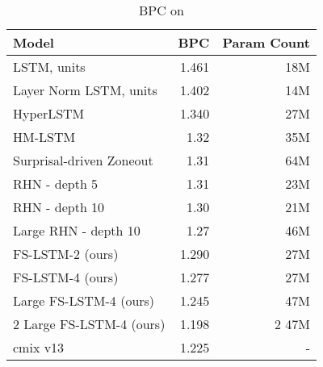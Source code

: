 \documentclass{article}
\begin{document}
\begin{table}
\caption{BPC on }
\label{table: enwik8}
\renewcommand{\arraystretch}{1.1}
\begin{center}
 \begin{tabular}{@{} lrr @{}} 
 \toprule[1.5pt]
 Model & BPC & Param Count \\ 
 \midrule
 LSTM,  units & 1.461 & 18M \\
 Layer Norm LSTM,  units & 1.402 & 14M\\
 HyperLSTM \cite{ha2016hyper} & 1.340 & 27M \\  
 HM-LSTM \cite{chung2016multiscale}& 1.32 & 35M \\
 Surprisal-driven Zoneout \cite{rocki2016surprisal} & 1.31 & 64M \\
 RHN - depth 5 \cite{zilly2016recurrent}& 1.31 & 23M \\
 RHN - depth 10  \cite{zilly2016recurrent}& 1.30 & 21M \\
 Large RHN - depth 10  \cite{zilly2016recurrent}& 1.27 & 46M \\
 \midrule
 FS-LSTM-2 (ours) & 1.290 & 27M \\
 FS-LSTM-4 (ours) & 1.277 & 27M \\
 Large FS-LSTM-4 (ours) & 1.245 & 47M \\
 2  Large FS-LSTM-4 (ours) & 1.198 & 2  47M \\
 \midrule
 cmix v13 \cite{cmix}  & 1.225 & - \\
 \bottomrule[1.5pt]
\end{tabular}
\end{center}
\end{table}
\end{document}
